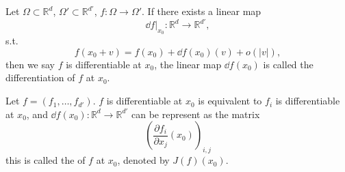 \begin{definition}
	Let $\Omega \subset \mathbb{R}^{d}$, $\Omega' \subset \mathbb{R}^{d'}$,
	$f: \Omega\to \Omega'$. If there exists a linear map
	\[
	\dd f\big|_{x_0} : \mathbb{R}^{d}\to \mathbb{R}^{d'},
	\]
	s.t.
	\[
	f(x_0+v) = f(x_0) + \dd f(x_0)(v) + o(|v|),
	\]
	then we say $f$ is differentiable at $x_0$, the linear map $\dd f(x_0)$ is
	called the differentiation of $f$ at $x_0$.
\end{definition}

\begin{proposition}
	Let $f = (f_1,\dots, f_{d'})$.
	$f$ is differentiable at $x_0$ is equivalent to $f_i$ is differentiable at $x_0$,
	and $\dd f(x_0): \mathbb{R}^{d}\to \mathbb{R}^{d'}$ can be represent as the matrix
	\[
		\left(\frac{\partial f_i}{\partial x_j}(x_0)\right)_{i,j}
	\]
	this is called the  of $f$ at $x_0$, denoted by $J(f)(x_0)$.
\end{proposition}
